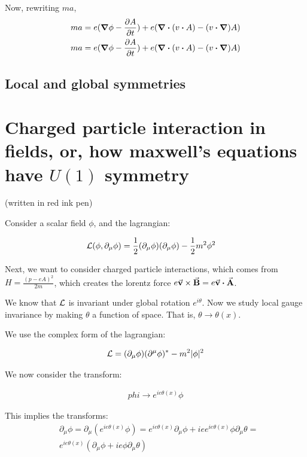 Now, rewriting $ma$,
\begin{align*}
ma &= e (\grad \phi - \pdv{A}{t}) + e (\div (v \vdot A) - (v \vdot \grad) A) \\
ma &= e (\grad \phi - \pdv{A}{t}) + e (\div (v \vdot A) - (v \vdot \grad) A)
\end{align*}

\section{Local and global symmetries}

\chapter{Charged particle interaction in fields, or, how maxwell's equations have $U(1)$ symmetry}
(written in red ink pen)

Consider a scalar field $\phi$, and the lagrangian:

\begin{align*}
    &\mathcal{L}(\phi, \partial_\mu \phi) = \frac{1}{2} (\partial_\mu \phi) (\partial_\mu \phi) - \frac{1}{2} m^2 \phi^2
\end{align*}

Next, we want to consider charged particle interactions, which comes from
$H = \frac{(p - eA)^2}{2m}$, which creates the lorentz force $e \va v \times \va B = e \va v \vdot \va A$.

We know that $\mathcal{L}$ is invariant under global rotation $e^{i \theta}$. Now we
study local gauge invariance by making $\theta$ a function of space. That is,
$\theta \to \theta(x)$.

We use the complex form of the lagrangian:

\begin{align*}
    \mathcal{L} = (\partial_\mu \phi) (\partial^\mu \phi)^* - m^2|\phi|^2
\end{align*}

We now consider the transform:

\begin{align*}
    phi \to e^{i e \theta(x)} \phi
\end{align*}

This implies the transforms:
\begin{align*}
    &\partial_\mu \phi = 
    \partial_\mu (e^{i e \theta(x)} \phi) = 
    e^{i e \theta(x)} \partial_\mu \phi + i e e^{i e \theta(x)} \phi \partial_\mu \theta = \\
    &e^{i e \theta(x)}(\partial_\mu \phi + i e \phi \partial_\mu \theta)
\end{align*}

